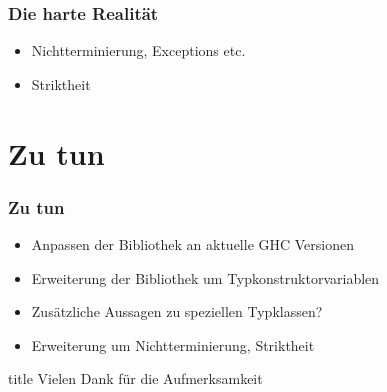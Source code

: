 \documentclass{beamer}
\begin{document}
\begin{frame}
\frametitle{Die harte Realität}

\begin{itemize}
\item Nichtterminierung, Exceptions etc.
\item Striktheit
\end{itemize}

\end{frame}

\section{Zu tun}

\begin{frame}
\frametitle{Zu tun}

\begin{itemize}
\item Anpassen der Bibliothek an aktuelle GHC Versionen
\item Erweiterung der Bibliothek um Typkonstruktorvariablen
\item Zusätzliche Aussagen zu speziellen Typklassen?
\item Erweiterung um Nichtterminierung, Striktheit
\end{itemize}

\end{frame}

  \begin{frame}
  \vfill
  \centering
  \begin{beamercolorbox}[sep=8pt,center,shadow=true,rounded=true]{title}
    Vielen Dank für die Aufmerksamkeit\par%
  \end{beamercolorbox}
  \vfill
  \end{frame}
\end{document}
